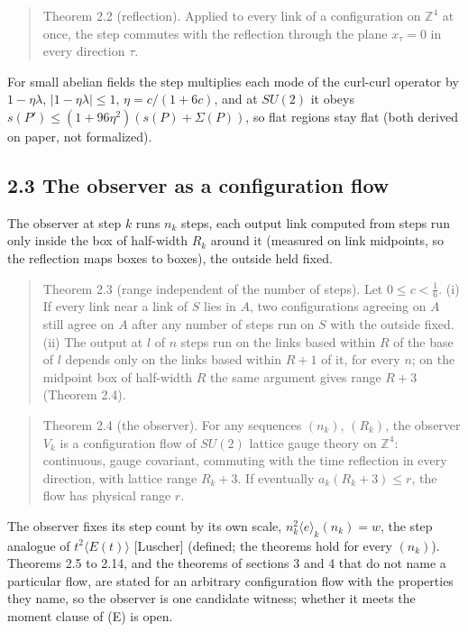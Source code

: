 \documentclass[10pt,letterpaper,twocolumn]{article}
\begin{document}
\begin{quote}
Theorem 2.2 (reflection). Applied to every link of a configuration on \(\mathbb Z^4\) at once, the step commutes with the reflection through the plane \(x_\tau=0\) in every direction \(\tau\).
\end{quote}

For small abelian fields the step multiplies each mode of the curl-curl operator by \(1-\eta\lambda\), \(|1-\eta\lambda|\le1\), \(\eta=c/(1+6c)\), and at \(SU(2)\) it obeys \(s(P')\le(1+96\eta^2)(s(P)+\Sigma(P))\), so flat regions stay flat (both derived on paper, not formalized).

\subsection{2.3 The observer as a configuration flow}\label{23-the-observer-as-a-configuration-flow}

The observer at step \(k\) runs \(n_k\) steps, each output link computed from steps run only inside the box of half-width \(R_k\) around it (measured on link midpoints, so the reflection maps boxes to boxes), the outside held fixed.

\begin{quote}
Theorem 2.3 (range independent of the number of steps). Let \(0\le c<\tfrac16\). (i) If every link near a link of \(S\) lies in \(A\), two configurations agreeing on \(A\) still agree on \(A\) after any number of steps run on \(S\) with the outside fixed. (ii) The output at \(l\) of \(n\) steps run on the links based within \(R\) of the base of \(l\) depends only on the links based within \(R+1\) of it, for every \(n\); on the midpoint box of half-width \(R\) the same argument gives range \(R+3\) (Theorem 2.4).
\end{quote}

\begin{quote}
Theorem 2.4 (the observer). For any sequences \((n_k)\), \((R_k)\), the observer \(V_k\) is a configuration flow of \(SU(2)\) lattice gauge theory on \(\mathbb Z^4\): continuous, gauge covariant, commuting with the time reflection in every direction, with lattice range \(R_k+3\). If eventually \(a_k(R_k+3)\le r\), the flow has physical range \(r\).
\end{quote}

The observer fixes its step count by its own scale, \(n_k^2\langle e\rangle_k(n_k)=w\), the step analogue of \(t^2\langle E(t)\rangle\) {[}Luscher{]} (defined; the theorems hold for every \((n_k)\)). Theorems 2.5 to 2.14, and the theorems of sections 3 and 4 that do not name a particular flow, are stated for an arbitrary configuration flow with the properties they name, so the observer is one candidate witness; whether it meets the moment clause of (E) is open.
\end{document}
